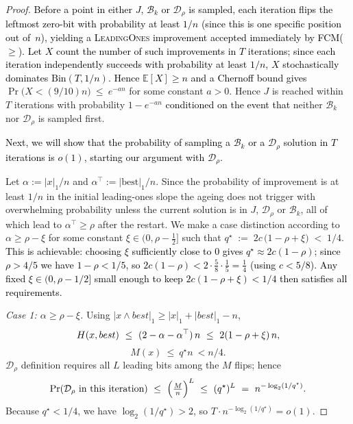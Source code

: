 \documentclass[lettersize,journal]{IEEEtran}
\newcommand{\rerev}[1]{\textcolor{black}{#1}}
\newcommand{\EE}{\mathbb{E}}
\begin{document}
{\begin{proof}
	\rerev{Before a point in either $J$, $\mathcal{B}_k$ or $\mathcal{D}_\rho$ is sampled, each iteration flips the leftmost zero-bit with probability at least $1/n$ (since this is one specific position out of~$n$), yielding a \textsc{LeadingOnes} improvement accepted immediately by FCM($\ge$).  Let $X$ count the number of such improvements in $T$ iterations; since each iteration independently succeeds with probability at least $1/n$, $X$ stochastically dominates $\mathrm{Bin}(T,1/n)$.  Hence $\EE[X]\ge n$ and a Chernoff bound gives}
	$
	\Pr\bigl(X<(9/10)n\bigr)\ \le\ e^{-a n}
	$
	for some constant $a>0$. Hence $J$ is reached within $T$ iterations with probability $1-e^{-a n}$ \rerev{conditioned on the event that} neither $\mathcal{B}_k$ nor $\mathcal{D}_\rho$ is sampled first.
	
	\textcolor{black}{
		Next, we will show that the probability of sampling a $\mathcal{B}_k$ or a $\mathcal{D}_\rho$ solution in $T$ iterations is $o(1)$, starting our argument with $\mathcal{D}_\rho$. 
		}
	
	Let $\alpha:=|x|_1/n$ and $\alpha^\top:=|\text{best}|_1/n$. Since the probability of improvement is at least $1/n$ in the initial leading-ones slope the ageing does not trigger with overwhelming probability unless the current solution is in $J$, $\mathcal{D}_\rho$ or $\mathcal{B}_k$, all of which lead to $\alpha^\top\ge\rho$ after the restart. We make a case distinction according to $\alpha\ge \rho-\xi$ for some constant $\xi\in(0,\rho-\tfrac12]$  such that	$q^\star \;:=\; 2c\,\bigl(1-\rho+\xi\bigr) \;<\; 1/4$.
\textcolor{black}{This is achievable: choosing $\xi$ sufficiently close to $0$ gives
$q^\star \approx 2c(1-\rho)$; since $\rho > 4/5$ we have $1-\rho < 1/5$,
so $2c(1-\rho) < 2 \cdot \tfrac{5}{8} \cdot \tfrac{1}{5} = \tfrac{1}{4}$
(using $c < 5/8$).  Any fixed $\xi \in (0, \rho - 1/2]$ small enough to
keep $2c(1-\rho+\xi) < 1/4$ then satisfies all requirements.}
	
	\emph{Case 1: $\alpha\ge \rho-\xi$.}
	Using $|x\wedge best|_1\ge |x|_1+|best|_1-n$,
	\[
	\rerev{H}(x,best)\ \le\ (2-\alpha-\alpha^\top)\,n\ \le\ 2(1-\rho+\xi)\,n,
	\]
	\[
	M(x)\ \le\ q^\star n\ <n/4
	.
	\]
	$\mathcal{D}_\rho$ definition requires all $L$ leading bits among the $M$ flips; hence
	\[
	\Pr(\text{$\mathcal{D}_\rho$ in this iteration})
	\ \le\
	\Bigl(\tfrac{M}{n}\Bigr)^{L}
	\ \le\
	(q^\star)^{L}
	\ =\
	n^{-\log_{2}(1/q^\star)}.
	\]
	Because $q^\star<1/4$, we have $\log_{2}(1/q^\star)>2$, so $T\cdot n^{-\log_{2}(1/q^\star)}=o(1)$.
	

\end{proof}}
\end{document}
